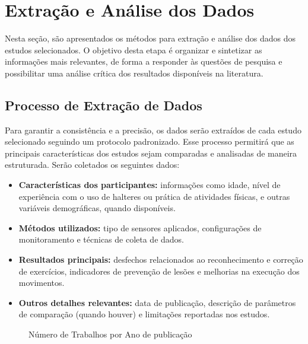 \documentclass[a4paper,12pt]{article}
\begin{document}
\section{Extração e Análise dos Dados}
\label{sec:extracao_analise_dados}

Nesta seção, são apresentados os métodos para extração e análise dos dados dos estudos selecionados. O objetivo desta etapa é organizar e sintetizar as informações mais relevantes, de forma a responder às questões de pesquisa e possibilitar uma análise crítica dos resultados disponíveis na literatura.

\subsection{Processo de Extração de Dados}

Para garantir a consistência e a precisão, os dados serão extraídos de cada estudo selecionado seguindo um protocolo padronizado. Esse processo permitirá que as principais características dos estudos sejam comparadas e analisadas de maneira estruturada. Serão coletados os seguintes dados:

\begin{itemize}
    \item \textbf{Características dos participantes:} informações como idade, nível de experiência com o uso de halteres ou prática de atividades físicas, e outras variáveis demográficas, quando disponíveis.
    \item \textbf{Métodos utilizados:} tipo de sensores aplicados, configurações de monitoramento e técnicas de coleta de dados.
    \item \textbf{Resultados principais:} desfechos relacionados ao reconhecimento e correção de exercícios, indicadores de prevenção de lesões e melhorias na execução dos movimentos.
    \item \textbf{Outros detalhes relevantes:} data de publicação, descrição de parâmetros de comparação (quando houver) e limitações reportadas nos estudos.
\end{itemize}

\begin{figure}[htbp]
    \centering
    \caption{Número de Trabalhos por Ano de publicação}
    \end{figure}
\end{document}
